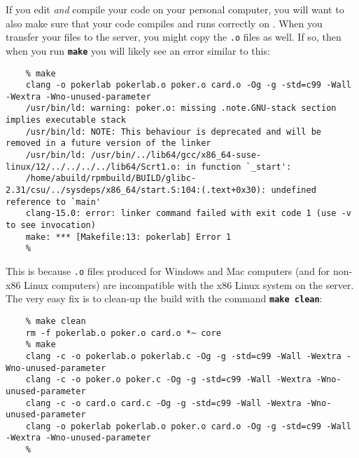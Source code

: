 If you edit \textit{and} compile your code on your personal computer, you will want to also  make sure that your code compiles and runs correctly on \runtimeenvironment.
When you transfer your files to the server, you might copy the \texttt{.o} files as well.
If so, then when you run \texttt{\textbf{make}} you will likely see an error similar to this:
\begin{verbatim}
    % make
    clang -o pokerlab pokerlab.o poker.o card.o -Og -g -std=c99 -Wall -Wextra -Wno-unused-parameter
    /usr/bin/ld: warning: poker.o: missing .note.GNU-stack section implies executable stack
    /usr/bin/ld: NOTE: This behaviour is deprecated and will be removed in a future version of the linker
    /usr/bin/ld: /usr/bin/../lib64/gcc/x86_64-suse-linux/12/../../../../lib64/Scrt1.o: in function `_start':
    /home/abuild/rpmbuild/BUILD/glibc-2.31/csu/../sysdeps/x86_64/start.S:104:(.text+0x30): undefined reference to `main'
    clang-15.0: error: linker command failed with exit code 1 (use -v to see invocation)
    make: *** [Makefile:13: pokerlab] Error 1
    %
\end{verbatim}

This is because \texttt{.o} files produced for Windows and Mac computers (and for non-x86 Linux computers) are incompatible with the x86 Linux system on the server.
The very easy fix is to clean-up the build with the command \texttt{\textbf{make clean}}:
\begin{verbatim}
    % make clean
    rm -f pokerlab.o poker.o card.o *~ core
    % make
    clang -c -o pokerlab.o pokerlab.c -Og -g -std=c99 -Wall -Wextra -Wno-unused-parameter
    clang -c -o poker.o poker.c -Og -g -std=c99 -Wall -Wextra -Wno-unused-parameter
    clang -c -o card.o card.c -Og -g -std=c99 -Wall -Wextra -Wno-unused-parameter
    clang -o pokerlab pokerlab.o poker.o card.o -Og -g -std=c99 -Wall -Wextra -Wno-unused-parameter
    %
\end{verbatim}

